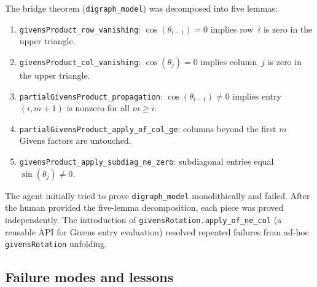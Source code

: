 \begin{humanparagraph}
The bridge theorem (\texttt{digraph\_model}) was decomposed into five lemmas:
\begin{enumerate}
\item \texttt{givensProduct\_row\_vanishing}: $\cos(\theta_{i-1}) = 0$ implies row~$i$ is
  zero in the upper triangle.
\item \texttt{givensProduct\_col\_vanishing}: $\cos(\theta_j) = 0$ implies column~$j$ is
  zero in the upper triangle.
\item \texttt{partialGivensProduct\_propagation}: $\cos(\theta_{i-1}) \neq 0$ implies entry
  $(i, m{+}1)$ is nonzero for all $m \ge i$.
\item \texttt{partialGivensProduct\_apply\_of\_col\_ge}: columns beyond the first $m$ Givens factors are
  untouched.
\item \texttt{givensProduct\_apply\_subdiag\_ne\_zero}: subdiagonal entries equal
  $\sin(\theta_j) \neq 0$.
\end{enumerate}
The agent initially tried to prove \texttt{digraph\_model} monolithically and
failed. After the human provided the five-lemma decomposition, each piece was
proved independently. The introduction of
\texttt{givensRotation.apply\_of\_ne\_col} (a reusable API for Givens entry
evaluation) resolved repeated failures from ad-hoc \texttt{givensRotation}
unfolding.
\end{humanparagraph}

\subsection{Failure modes and lessons}

